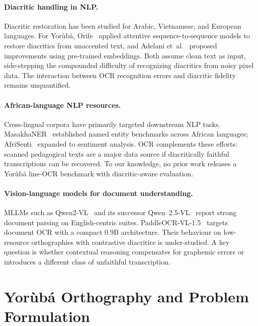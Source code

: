 \documentclass{article}
\newcommand{\Yoruba}{Yor\`ub\'a}
\begin{document}
\paragraph{Diacritic handling in NLP.}
Diacritic restoration has been studied for Arabic, Vietnamese, and European languages. For \Yoruba{}, Orife~ applied attentive sequence-to-sequence models to restore diacritics from unaccented text, and Adelani et~al.~ proposed improvements using pre-trained embeddings. Both assume clean text as input, side-stepping the compounded difficulty of recognizing diacritics from noisy pixel data. The interaction between OCR recognition errors and diacritic fidelity remains unquantified.

\paragraph{African-language NLP resources.}
Cross-lingual corpora have primarily targeted downstream NLP tasks. MasakhaNER~\cite{adelani2021masakhaner} established named entity benchmarks across African languages; AfriSenti~\cite{muhammad2023afrisenti} expanded to sentiment analysis. OCR complements these efforts: scanned pedagogical texts are a major data source if diacritically faithful transcriptions can be recovered. To our knowledge, no prior work releases a \Yoruba{} line-OCR benchmark with diacritic-aware evaluation.

\paragraph{Vision-language models for document understanding.}
MLLMs such as Qwen2-VL~\cite{bai2024qwen2vl} and its successor Qwen~2.5-VL~\cite{qwen2025vl} report strong document parsing on English-centric suites. PaddleOCR-VL-1.5~\cite{cui2026paddleocrvl} targets document OCR with a compact 0.9B architecture. Their behaviour on low-resource orthographies with contrastive diacritics is under-studied. A key question is whether contextual reasoning compensates for graphemic errors or introduces a different class of unfaithful transcription.

\section{\Yoruba{} Orthography and Problem Formulation}
\end{document}
